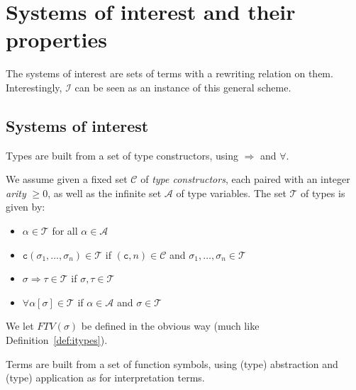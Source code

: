 \documentclass[runningheads,a4paper]{llncs}
\newcommand{\Iterms}{\mathcal{I}}
\newcommand{\Typevars}{\mathcal{A}}
\newcommand{\Types}{\mathcal{T}}
\newcommand{\TypeConstructors}{\mathcal{C}}
\newcommand{\quant}[2]{\forall #1[#2]}
\newcommand{\arrtype}{\Rightarrow}
\newcommand{\FTV}{\mathit{FTV}}
\newcommand{\con}{\mathtt{c}}
\begin{document}
\section{Systems of interest and their properties}

The systems of interest are sets of terms with a rewriting relation on
them.  Interestingly, $\Iterms$ can be seen as an instance of this general
scheme.

\subsection{Systems of interest}

Types are built from a set of type constructors, using $\arrtype$ and
$\forall$.

\begin{definition}
We assume given a fixed set $\TypeConstructors$ of \emph{type
constructors}, each paired with an integer \emph{arity} $\geq 0$, as
well as the infinite set $\Typevars$ of type variables.  The set
$\Types$ of types is given by:
\begin{itemize}
\item $\alpha \in \Types$ for all $\alpha \in \Typevars$
\item $\con(\sigma_1,\dots,\sigma_n) \in \Types$ if $(\con,n) \in
  \TypeConstructors$ and $\sigma_1,\dots,\sigma_n \in \Types$
\item $\sigma \arrtype \tau \in \Types$ if $\sigma,\tau \in \Types$
\item $\quant{\alpha}{\sigma} \in \Types$ if $\alpha \in \Typevars$ and
  $\sigma \in \Types$
\end{itemize}
We let $\FTV(\sigma)$ be defined in the obvious way (much like
Definition~\ref{def:itypes}).
\end{definition}

Terms are built from a set of function symbols, using (type) abstraction
and (type) application as for interpretation terms.
\end{document}
